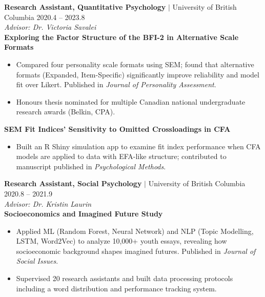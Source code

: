 \documentclass[11pt,letterpaper]{article}
\newcommand{\project}[1]{\textbf{\textcolor{black!80}{#1}}}
\newcommand{\advisor}[1]{\textit{Advisor: #1}}
\begin{document}
\vspace{0.5em}

\noindent\textbf{Research Assistant, Quantitative Psychology} $|$ University of British Columbia \hfill 2020.4 -- 2023.8\\
\noindent\advisor{Dr. Victoria Savalei}\\[0.3em]
\noindent\project{Exploring the Factor Structure of the BFI-2 in Alternative Scale Formats}
\begin{itemize}
    \item Compared four personality scale formats using SEM; found that alternative formats (Expanded, Item-Specific) significantly improve reliability and model fit over Likert. Published in \textit{Journal of Personality Assessment}.
    \item Honours thesis nominated for multiple Canadian national undergraduate research awards (Belkin, CPA).
\end{itemize}
\noindent\project{SEM Fit Indices' Sensitivity to Omitted Crossloadings in CFA}
\begin{itemize}
    \item Built an R Shiny simulation app to examine fit index performance when CFA models are applied to data with EFA-like structure; contributed to manuscript published in \textit{Psychological Methods}.
\end{itemize}

\vspace{0.5em}

\noindent\textbf{Research Assistant, Social Psychology} $|$ University of British Columbia \hfill 2020.8 -- 2021.9\\
\noindent\advisor{Dr. Kristin Laurin}\\[0.3em]
\noindent\project{Socioeconomics and Imagined Future Study}
\begin{itemize}
    \item Applied ML (Random Forest, Neural Network) and NLP (Topic Modelling, LSTM, Word2Vec) to analyze 10,000+ youth essays, revealing how socioeconomic background shapes imagined futures. Published in \textit{Journal of Social Issues}.
    \item Supervised 20 research assistants and built data processing protocols including a word distribution and performance tracking system.
\end{itemize}

\vspace{0.5em}
\end{document}
